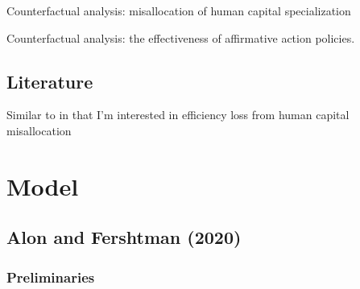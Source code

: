 \documentclass[10 pt]{article}
\begin{document}
{\begin{outline}
\begin{blist}
\item Counterfactual analysis: misallocation of human capital specialization

\item Counterfactual analysis: the effectiveness of affirmative action policies. 

\end{blist}



\end{outline}

\subsection*{Literature}

\begin{blist}

\item Similar to \textcite{D08} in that I'm interested in efficiency loss from human capital misallocation 

\end{blist}


} %


\section{Model}

\subsection{Alon and Fershtman (2020)} \nocite{AF20}

\subsubsection{Preliminaries}
\end{document}
